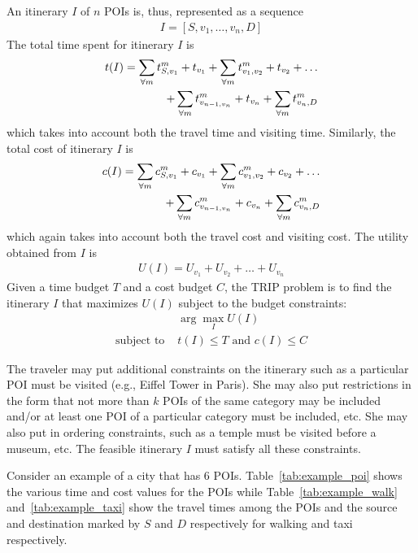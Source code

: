 An itinerary $I$ of $n$ POIs is, thus, represented as a sequence
%
\begin{align}
	I = [ S, v_1, \dots, v_n, D ]
\end{align}
%
The total time spent for itinerary $I$ is
%
\begin{align}
	t(I) = \sum_{\forall m} t^{m}_{S,v_1} + t_{v_1} + \sum_{\forall m} t^{m}_{v_1,v_2} + t_{v_2} + \dots \notag \\ + \sum_{\forall m} t^{m}_{v_{n-1,v_n}} + t_{v_n} + \sum_{\forall m} t^{m}_{v_n,D}
\end{align}
%
which takes into account both the travel time and visiting time.  Similarly,
the total cost of itinerary $I$ is 
%
\begin{align}
	c(I) = \sum_{\forall m}c^{m}_{S,v_1} + c_{v_1} + \sum_{\forall m}c^{m}_{v_1,v_2} + c_{v_2} + \dots \notag \\ + \sum_{\forall m}c^{m}_{v_{n-1,v_n}} + c_{v_n} + \sum_{\forall m}c^{m}_{v_n,D}
\end{align}
%
which again takes into account both the travel cost and visiting cost.  The
utility obtained from $I$ is
%
\begin{align}
	U(I) = U_{v_1} + U_{v_2} + \dots + U_{v_n}
\end{align}
%
Given a time budget $T$ and a cost budget $C$, the TRIP problem is to find the
itinerary $I$ that maximizes $U(I)$ subject to the budget constraints:
%
\begin{align}
	& \arg\max_I U(I) \\
	\text{subject to } & t(I) \leq T \text{ and } c(I) \leq C
\end{align}

The traveler may put additional constraints on the itinerary such as
a particular POI must be visited (e.g., Eiffel Tower in Paris).  She
may also put restrictions in the form that not more than $k$ POIs of
the same category may be included and/or at least one POI of a particular
category must be included, etc.  She may also put in ordering
constraints, such as a temple must be visited before a museum, etc.  The feasible itinerary $I$ must satisfy all these
constraints.

Consider an example of a city that has 6 POIs.
Table~\ref{tab:example_poi} shows the various time and cost values for
the POIs while Table~\ref{tab:example_walk} and~\ref{tab:example_taxi} show the travel times among the POIs and
the source and destination marked by $S$ and $D$ respectively for
walking and taxi respectively.

